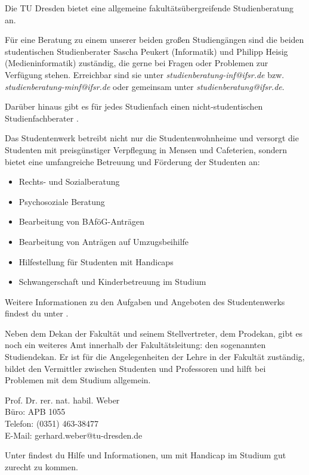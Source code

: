 Die TU Dresden bietet eine allgemeine fakultätsübergreifende Studienberatung  an.

Für eine Beratung zu einem unserer beiden großen Studiengängen sind die beiden studentischen Studienberater Sascha Peukert (Informatik) und Philipp Heisig (Medieninformatik) zuständig, die gerne bei Fragen oder Problemen zur Verfügung stehen. Erreichbar sind sie unter \textit{studienberatung-inf@ifsr.de} bzw. \textit{studienberatung-minf@ifsr.de} oder gemeinsam unter \textit{studienberatung@ifsr.de}.

Darüber hinaus gibt es für jedes Studienfach einen nicht-studentischen Studienfachberater .

\newpage

Das Studentenwerk betreibt nicht nur die Studentenwohnheime und versorgt die Studenten mit preisgünstiger Verpflegung in Mensen und Cafeterien, sondern bietet eine umfangreiche Betreuung und Förderung der Studenten an:
\begin{itemize}
\item Rechts- und Sozialberatung
\item Psychosoziale Beratung
\item Bearbeitung von BAföG-Anträgen
\item Bearbeitung von Anträgen auf Umzugsbeihilfe
\item Hilfestellung für Studenten mit Handicaps
\item Schwangerschaft und Kinderbetreuung im Studium
\end{itemize}
Weitere Informationen zu den Aufgaben und Angeboten des Studentenwerks findest du unter .

Neben dem Dekan der Fakultät und seinem Stellvertreter, dem Prodekan, gibt es noch ein weiteres Amt innerhalb der Fakultätsleitung:
den sogenannten Studiendekan.
Er ist für die Angelegenheiten der Lehre in der Fakultät zuständig, bildet den Vermittler zwischen Studenten und Professoren und hilft bei Problemen mit dem Studium allgemein.

Prof. Dr. rer. nat. habil. Weber \\
Büro: APB 1055 \\
Telefon: (0351) 463-38477 \\
E-Mail: gerhard.weber@tu-dresden.de

Unter  findest du Hilfe und Informationen, um mit Handicap im Studium gut zurecht zu kommen.

